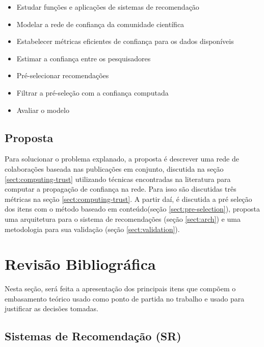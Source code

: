 \documentclass[12pt]{article}
\begin{document}
\begin{itemize}
  \item Estudar funções e aplicações de sistemas de recomendação
  \item Modelar a rede de confiança da comunidade científica
  \item Estabelecer métricas eficientes de confiança para os dados disponíveis
  \item Estimar a confiança entre os pesquisadores 
  \item Pré-selecionar recomendações
  \item Filtrar a pré-seleção com a confiança computada
  \item Avaliar o modelo
\end{itemize}

\subsection{Proposta}

Para solucionar o problema explanado, a proposta é descrever uma rede de colaborações baseada nas publicações em conjunto, 
discutida na seção \ref{sect:computing-trust} utilizando técnicas encontradas na literatura para computar a propagação de 
confiança na rede. Para isso são discutidas três métricas na seção \ref{sect:computing-trust}. A partir daí, é discutida a 
pré seleção dos itens com o método baseado em conteúdo(seção \ref{sect:pre-selection}), proposta uma arquitetura para o sistema 
de recomendações (seção \ref{sect:arch}) e uma metodologia para sua validação (seção \ref{sect:validation}).

\section{Revisão Bibliográfica}

Nesta seção, será feita a apresentação dos principais itens que compõem o  embasamento teórico usado como ponto de 
partida no trabalho e usado para justificar as decisões tomadas.

\subsection{Sistemas de Recomendação (SR)}
\end{document}
